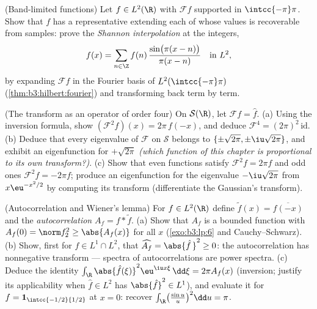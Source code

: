 \begin{exercise}[$\star\star$]\label{exo:b3:fouriertransform:10}
(Band-limited functions) Let $f \in L^2(\R)$ with $\mathcal Ff$
supported in $\intcc{-\pi}\pi$. Show that $f$ has a
representative extending each of whose values is recoverable
from samples: prove the \emph{Shannon interpolation} at the
integers,
\[
f(x) = \sum_{n\in\Z} f(n)\,
\frac{\sin\bigl(\pi(x - n)\bigr)}{\pi(x - n)}
\quad\text{in } L^2,
\]
by expanding $\mathcal Ff$ in the Fourier basis of
$L^2(\intcc{-\pi}\pi)$ (\cref{thm:b3:hilbert:fourier}) and
transforming back term by term.
\end{exercise}

\begin{exercise}[$\star\star$]\label{exo:b3:fouriertransform:11}
(The transform as an operator of order four) On $\mathcal
S(\R)$, let $\mathcal F f = \hat f$.
(a) Using the inversion formula, show $(\mathcal F^2f)(x) =
2\pi\,f(-x)$, and deduce $\mathcal F^4 = (2\pi)^2\,
\mathrm{id}$.
(b) Deduce that every eigenvalue of $\mathcal F$ on
$\mathcal S$ belongs to $\{\pm\sqrt{2\pi},
\pm\iu\sqrt{2\pi}\}$, and exhibit an eigenfunction for
$+\sqrt{2\pi}$ \emph{(which function of this chapter is
proportional to its own transform?)}.
(c) Show that even functions satisfy $\mathcal F^2f = 2\pi
f$ and odd ones $\mathcal F^2f = -2\pi f$; produce an
eigenfunction for the eigenvalue $-\iu\sqrt{2\pi}$ from
$x\eu^{-x^2/2}$ by computing its transform (differentiate
the Gaussian's transform).
\end{exercise}

\begin{exercise}[$\star\star$]\label{exo:b3:fouriertransform:12}
(Autocorrelation and Wiener's lemma) For $f \in L^2(\R)$
define $\tilde f(x) = \overline{f(-x)}$ and the
\emph{autocorrelation} $A_f = f * \tilde f$.
(a) Show that $A_f$ is a bounded  function with
$A_f(0) = \norm f_2^2 \geq \abs{A_f(x)}$ for all $x$
(\cref{exo:b3:lp:6} and Cauchy--Schwarz).
(b) Show, first for $f \in L^1\cap L^2$, that
$\widehat{A_f} = \abs{\hat f\,}^2 \geq 0$: the
autocorrelation has nonnegative transform --- spectra of
autocorrelations are power spectra.
(c) Deduce the identity $\int_\R\abs{\hat
f(\xi)}^2\eu^{\iu x\xi}\,\dd\xi = 2\pi A_f(x)$ (inversion;
justify its applicability when $\hat f \in L^2$ has
$\abs{\hat f}^2 \in L^1$), and evaluate it for $f = \mathbf
1_{\intcc{-1/2}{1/2}}$ at $x = 0$: recover
$\int_\R\bigl(\frac{\sin u}u\bigr)^2\dd u = \pi$.
\end{exercise}

